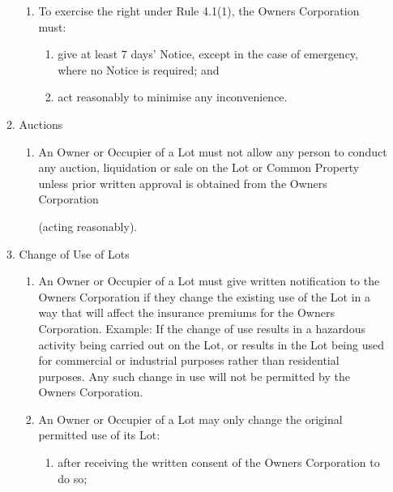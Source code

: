 \documentclass{article}
\begin{document}
\begin{enumerate}[label=\arabic*.]
\begin{enumerate}[label=\arabic{enumi}.\arabic*.]
\begin{enumerate}[label=(\arabic*)]
\item  To exercise the right under Rule 4.1(1), the Owners Corporation must:

\begin{enumerate}[label=(\alph*)]

\item  give at least 7 days’ Notice, except in the case of emergency, where no Notice is required; and

\item  act reasonably to minimise any inconvenience.

\end{enumerate}

\end{enumerate}

\item  Auctions

\begin{enumerate}[label=(\arabic*)]

\item  An Owner or Occupier of a Lot must not allow any person to conduct any auction, liquidation or sale on the Lot or Common Property unless prior written approval is obtained from the Owners Corporation

(acting reasonably).

\end{enumerate}

\item  Change of Use of Lots

\begin{enumerate}[label=(\arabic*)]

\item  An Owner or Occupier of a Lot must give written notification to the Owners Corporation if they change the existing use of the Lot in a way that will affect the insurance premiums for the Owners Corporation. Example: If the change of use results in a hazardous activity being carried out on the Lot, or results in the Lot being used for commercial or industrial purposes rather than residential purposes. Any such change in use will not be permitted by the Owners Corporation.

\item  An Owner or Occupier of a Lot may only change the original permitted use of its Lot:

\begin{enumerate}[label=(\alph*)]

\item  after receiving the written consent of the Owners Corporation to do so;


\end{enumerate}
\end{enumerate}
\end{enumerate}
\end{enumerate}
\end{document}

